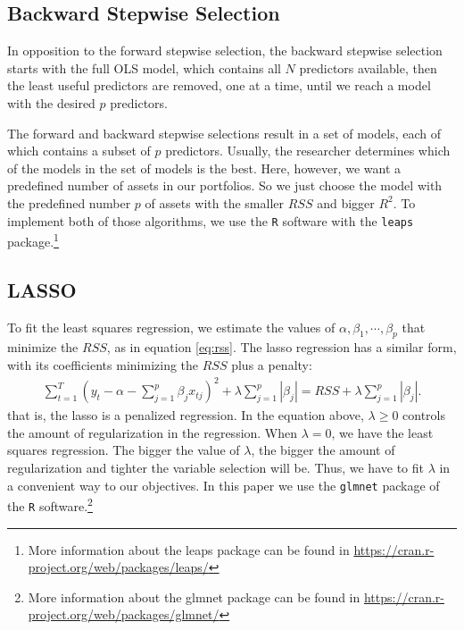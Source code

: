 \documentclass[preprint, doubleblind, authoryear,10pt]{elsarticle}
\begin{document}
\subsection{Backward Stepwise Selection}

In opposition to the forward stepwise selection, the backward stepwise selection starts with the full OLS model, which contains all $N$ predictors available, then the least useful predictors are removed, one at a time, until we reach a model with the desired $p$ predictors.

The forward and backward stepwise selections result in a set of models, each of which contains a subset of $p$ predictors.
Usually, the researcher determines which of the models in the set of models is the best.
Here, however, we want a predefined number of assets in our portfolios.
So we just choose the model with the predefined number $p$ of assets with the smaller $RSS$ and bigger $R^2$.
To implement both of those algorithms, we  use the \texttt{R} software with the \texttt{leaps} package.\footnote{More information about the leaps package can be found in \url{https://cran.r-project.org/web/packages/leaps/}}

\subsection{LASSO}

To fit the least squares regression, we estimate the values of $\alpha, \beta_1, \cdots, \beta_p$ that minimize the $RSS$, as in equation \eqref{eq:rss}.
The lasso regression has a similar form, with its coefficients minimizing the $RSS$ plus a penalty: 
\begin{align} \label{lasso-reg} %
\sum_{t=1}^{T} 
\left( y_t - \alpha - \sum_{j=1}^{p} \beta_j x_{tj} \right)^2 +
\lambda \sum_{j=1}^{p} |\beta_{j}| =
	RSS + 
	\lambda \sum_{j=1}^{p} |\beta_{j}| .
\end{align}
that is, the lasso is a penalized regression.
In the equation above, $\lambda \geq 0$ controls the amount of regularization in the regression.
When $\lambda = 0$, we have the least squares regression.
The bigger the value of $\lambda$, the bigger the amount of regularization and tighter the variable selection will be.
Thus, we have to fit $\lambda$ in a convenient way to our objectives.
In this paper we use the \texttt{glmnet} package of the \texttt{R} software.\footnote{More information about the glmnet package can be found in \url{https://cran.r-project.org/web/packages/glmnet/}}
\end{document}
